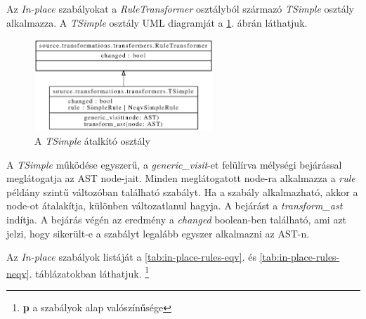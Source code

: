 Az \emph{In-place} szabályokat
a \emph{RuleTransformer} osztályból származó \emph{TSimple} osztály alkalmazza.
A \emph{TSimple} osztály UML diagramját a \ref{fig:TSimple}. ábrán láthatjuk.

\begin{figure}[H]
	\centering
	\includegraphics[width=0.6\textwidth]{images/uml/TSimple.eps}
	\caption{A \emph{TSimple} átalkító osztály}
	\label{fig:TSimple}
\end{figure}

A \emph{TSimple} működése egyszerű,
a \emph{generic\_visit}-et felülírva mélységi bejárással meglátogatja az AST node-jait.
Minden meglátogatott node-ra alkalmazza
a \emph{rule} példány szintű változóban található szabályt.
Ha a szabály alkalmazható, akkor a node-ot átalakítja, különben változatlanul hagyja.
A bejárást a \emph{transform\_ast} indítja.
A bejárás végén az eredmény a \emph{changed} boolean-ben található,
ami azt jelzi, hogy sikerült-e a szabályt legalább egyszer alkalmazni az AST-n.

Az \emph{In-place} szabályok listáját a \ref{tab:in-place-rules-eqv}. és \ref{tab:in-place-rules-neqv}.
táblázatokban láthatjuk.
\footnote{\textbf{p} a szabályok alap valószínűsége}

